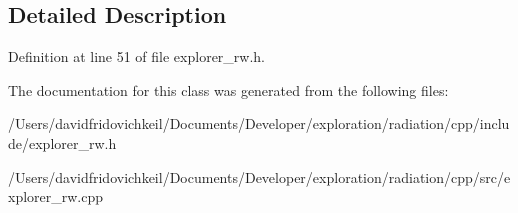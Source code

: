\subsection{Detailed Description}


Definition at line 51 of file explorer\+\_\+rw.\+h.



The documentation for this class was generated from the following files\+:\begin{DoxyCompactItemize}
\item 
/\+Users/davidfridovichkeil/\+Documents/\+Developer/exploration/radiation/cpp/include/explorer\+\_\+rw.\+h\item 
/\+Users/davidfridovichkeil/\+Documents/\+Developer/exploration/radiation/cpp/src/explorer\+\_\+rw.\+cpp\end{DoxyCompactItemize}
